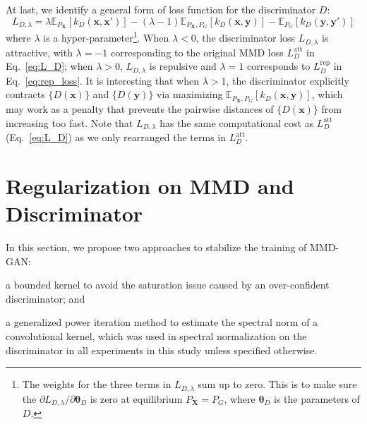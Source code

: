 \documentclass{article} %
\theoremstyle{plain}
\newtheorem*{proposition 1*}{Proposition 1}
\newcommand{\set}[1]{\mathbb{#1}}  %
\newcommand{\rdv}[1]{\mathbf{#1}}  %
\begin{document}
At last, we identify a general form of loss function for the discriminator \(D\):
\begin{equation}\label{eq:L_D_general}
L_{D,\lambda}=\lambda\set{E}_{P_{\rdv{X}}}[k_D(\bm{x},\bm{x}')] -(\lambda-1)\set{E}_{P_{\rdv{X}},P_{G}}[k_D(\bm{x},\bm{y})]-\set{E}_{P_G}[k_D(\bm{y},\bm{y}')]
\end{equation}
where \(\lambda\) is a hyper-parameter\footnote{The weights for the three terms in \(L_{D,\lambda}\) sum up to zero. This is to make sure the \(\partial L_{D,\lambda}/\partial \bm{\theta}_{D}\) is zero at equilibrium \(P_{\rdv{X}}=P_{G}\), where \(\bm{\theta}_{D}\) is the parameters of \(D\).}. When \(\lambda<0\), the discriminator loss \(L_{D,\lambda}\) is attractive, with \(\lambda=-1\) corresponding to the original MMD loss \(L_D^{\text{att}}\) in Eq.~\ref{eq:L_D}; when \(\lambda>0\), \(L_{D,\lambda}\) is repulsive and \(\lambda=1\) corresponds to \(L_D^{\text{rep}}\) in Eq.~\ref{eq:rep_loss}. It is interesting that when \(\lambda>1\), the discriminator explicitly contracts \(\{D(\bm{x})\}\) and \(\{D(\bm{y})\}\) via maximizing \(\set{E}_{P_{\rdv{X}},P_{G}}[k_D(\bm{x},\bm{y})]\), which may work as a penalty that prevents the pairwise distances of \(\{D(\bm{x})\}\) from increasing too fast. Note that \(L_{D,\lambda}\) has the same computational cost as \(L_{D}^{\text{att}}\) (Eq.~\ref{eq:L_D}) as we only rearranged the terms in \(L_{D}^{\text{att}}\).

\section{Regularization on MMD and Discriminator}
\label{sec:regularizations}
In this section, we propose two approaches to stabilize the training of MMD-GAN: 
\begin{enumerate*}[label=\arabic*)]
\item a bounded kernel to avoid the saturation issue caused by an over-confident discriminator; and 
\item a generalized power iteration method to estimate the spectral norm of a convolutional kernel, which was used in spectral normalization on the discriminator in all experiments in this study unless specified otherwise.
\end{enumerate*}
\end{document}
